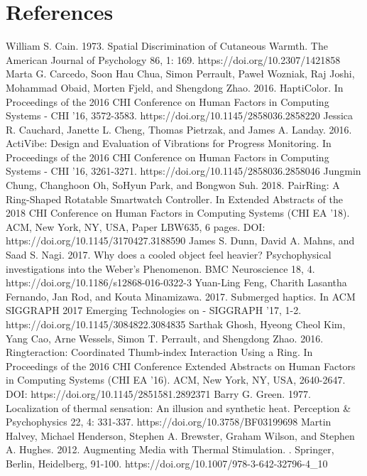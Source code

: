 \documentclass[preprint,12pt]{elsarticle}
\begin{document}
\section*{References}
\begin{thebibliography}{00}


William S. Cain. 1973. Spatial Discrimination of Cutaneous Warmth. The American Journal of Psychology 86, 1: 169. https://doi.org/10.2307/1421858
Marta G. Carcedo, Soon Hau Chua, Simon Perrault, Paweł Wozniak, Raj Joshi, Mohammad Obaid, Morten Fjeld, and Shengdong Zhao. 2016. HaptiColor. In Proceedings of the 2016 CHI Conference on Human Factors in Computing Systems - CHI '16, 3572-3583. https://doi.org/10.1145/2858036.2858220
Jessica R. Cauchard, Janette L. Cheng, Thomas Pietrzak, and James A. Landay. 2016. ActiVibe: Design and Evaluation of Vibrations for Progress Monitoring. In Proceedings of the 2016 CHI Conference on Human Factors in Computing Systems - CHI '16, 3261-3271. https://doi.org/10.1145/2858036.2858046
Jungmin Chung, Changhoon Oh, SoHyun Park, and Bongwon Suh. 2018. PairRing: A Ring-Shaped Rotatable Smartwatch Controller. In Extended Abstracts of the 2018 CHI Conference on Human Factors in Computing Systems (CHI EA '18). ACM, New York, NY, USA, Paper LBW635, 6 pages. DOI: https://doi.org/10.1145/3170427.3188590
James S. Dunn, David A. Mahns, and Saad S. Nagi. 2017. Why does a cooled object feel heavier? Psychophysical investigations into the Weber's Phenomenon. BMC Neuroscience 18, 4. https://doi.org/10.1186/s12868-016-0322-3
Yuan-Ling Feng, Charith Lasantha Fernando, Jan Rod, and Kouta Minamizawa. 2017. Submerged haptics. In ACM SIGGRAPH 2017 Emerging Technologies on - SIGGRAPH '17, 1-2. https://doi.org/10.1145/3084822.3084835
Sarthak Ghosh, Hyeong Cheol Kim, Yang Cao, Arne Wessels, Simon T. Perrault, and Shengdong Zhao. 2016. Ringteraction: Coordinated Thumb-index Interaction Using a Ring. In Proceedings of the 2016 CHI Conference Extended Abstracts on Human Factors in Computing Systems (CHI EA '16). ACM, New York, NY, USA, 2640-2647. DOI: https://doi.org/10.1145/2851581.2892371
Barry G. Green. 1977. Localization of thermal sensation: An illusion and synthetic heat. Perception \& Psychophysics 22, 4: 331-337. https://doi.org/10.3758/BF03199698
Martin Halvey, Michael Henderson, Stephen A. Brewster, Graham Wilson, and Stephen A. Hughes. 2012. Augmenting Media with Thermal Stimulation. . Springer, Berlin, Heidelberg, 91-100. https://doi.org/10.1007/978-3-642-32796-4\_10

\end{thebibliography}
\end{document}
